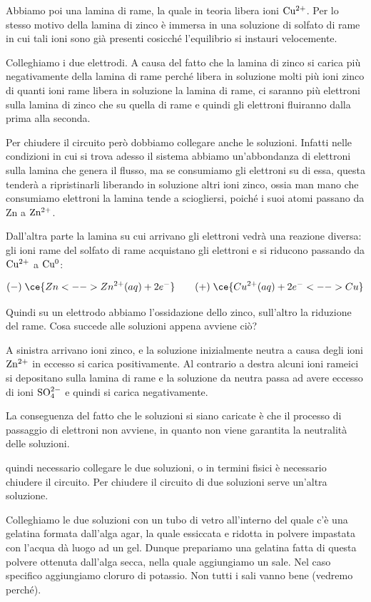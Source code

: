 Abbiamo poi una lamina di rame, la quale in teoria libera ioni $\rm Cu^{2+}$. Per lo stesso motivo della lamina di zinco è immersa in una soluzione di solfato di rame in cui tali ioni sono già presenti cosicché l'equilibrio si instauri velocemente.

Colleghiamo i due elettrodi. A causa del fatto che la lamina di zinco si carica più negativamente della lamina di rame perché libera in soluzione molti più ioni zinco di quanti ioni rame libera in soluzione la lamina di rame, ci saranno più elettroni sulla lamina di zinco che su quella di rame e quindi gli elettroni fluiranno dalla prima alla seconda.

Per chiudere il circuito però dobbiamo collegare anche le soluzioni. Infatti nelle condizioni in cui si trova adesso
il sistema abbiamo un'abbondanza di elettroni sulla lamina che genera il flusso, ma se consumiamo gli elettroni su di essa, questa tenderà a ripristinarli liberando in soluzione altri ioni zinco, ossia man mano che consumiamo elettroni la lamina tende a sciogliersi, poiché i suoi atomi passano da Zn a $\rm Zn^{2+}$.

Dall'altra parte la lamina su cui arrivano gli elettroni vedrà una reazione diversa: gli ioni rame del solfato di rame acquistano gli elettroni e si riducono passando da $\rm Cu^{2+}$ a $\rm Cu^0$:

$$(-) \; \ce{Zn <--> Zn^{2+}(aq) + 2e^-} \qquad (+) \; \ce{ Cu^{2+}(aq) + 2e^- <--> Cu}$$

Quindi su un elettrodo abbiamo l'ossidazione dello zinco, sull'altro la riduzione del rame. Cosa succede alle soluzioni appena avviene ciò?

A sinistra arrivano ioni zinco, e la soluzione inizialmente neutra a causa degli ioni $\rm Zn^{2+}$ in eccesso si carica positivamente. Al contrario a destra alcuni ioni rameici si depositano sulla lamina di rame e la soluzione da neutra passa ad avere eccesso di ioni $\rm SO_4^{2-}$ e quindi si carica negativamente.

La conseguenza del fatto che le soluzioni si siano caricate è che il processo di passaggio di elettroni non avviene, in quanto non viene garantita la neutralità delle soluzioni.

\E quindi necessario collegare le due soluzioni, o in termini fisici è necessario chiudere il circuito. Per chiudere il circuito di due soluzioni serve un'altra soluzione.

Colleghiamo le due soluzioni con un tubo di vetro all'interno del quale c'è una gelatina formata dall'alga agar, la quale essiccata e ridotta in polvere impastata con l'acqua dà luogo ad un gel. Dunque prepariamo una gelatina fatta di questa polvere ottenuta dall'alga secca, nella quale aggiungiamo un sale. Nel caso specifico aggiungiamo cloruro di potassio. Non tutti i sali vanno bene (vedremo perché).

